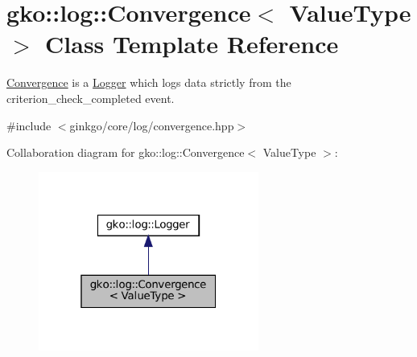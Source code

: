 \hypertarget{classgko_1_1log_1_1Convergence}{}\section{gko\+:\+:log\+:\+:Convergence$<$ Value\+Type $>$ Class Template Reference}
\label{classgko_1_1log_1_1Convergence}


\hyperlink{classgko_1_1log_1_1Convergence}{Convergence} is a \hyperlink{classgko_1_1log_1_1Logger}{Logger} which logs data strictly from the {\ttfamily criterion\+\_\+check\+\_\+completed} event.  




{\ttfamily \#include $<$ginkgo/core/log/convergence.\+hpp$>$}



Collaboration diagram for gko\+:\+:log\+:\+:Convergence$<$ Value\+Type $>$\+:
\nopagebreak
\begin{figure}[H]
\begin{center}
\leavevmode
\includegraphics[width=205pt]{classgko_1_1log_1_1Convergence__coll__graph}
\end{center}
\end{figure}

